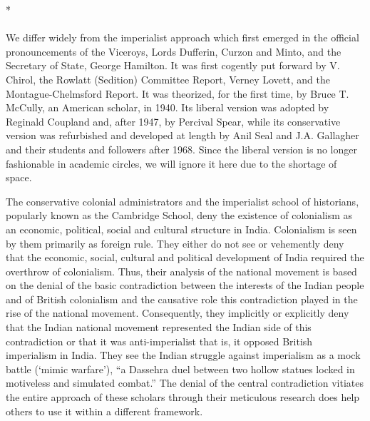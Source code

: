 \begin{center}*\end{center}

\paragraph*{}
We differ widely from the imperialist approach which first emerged in the official pronouncements of the Viceroys, Lords Dufferin, Curzon and Minto, and the Secretary of State, George Hamilton. It was first cogently put forward by V. Chirol, the Rowlatt (Sedition) Committee Report, Verney Lovett, and the Montague-Chelmsford Report. It was theorized, for the first time, by Bruce T. McCully, an American scholar, in 1940. Its liberal version was adopted by Reginald Coupland and, after 1947, by Percival Spear, while its conservative version was refurbished and developed at length by Anil Seal and J.A. Gallagher and their students and followers after 1968. Since the liberal version is no longer fashionable in academic circles, we will ignore it here due to the shortage of space.

The conservative colonial administrators and the imperialist school of historians, popularly known as the Cambridge School, deny the existence of colonialism as an economic, political, social and cultural structure in India. Colonialism is seen by them primarily as foreign rule. They either do not see or vehemently deny that the economic, social, cultural and political development of India required the overthrow of colonialism. Thus, their analysis of the national movement is based on the denial of the basic contradiction between the interests of the Indian people and of British colonialism and the causative role this contradiction played in the rise of the national movement. Consequently, they implicitly or explicitly deny that the Indian national movement represented the Indian side of this contradiction or that it was anti-imperialist that is, it opposed British imperialism in India. They see the Indian struggle against imperialism as a mock battle (`mimic warfare'), ``a Dassehra duel between two hollow statues locked in motiveless and simulated combat.'' The denial of the central contradiction vitiates the entire approach of these scholars through their meticulous research does help others to use it within a different framework.

